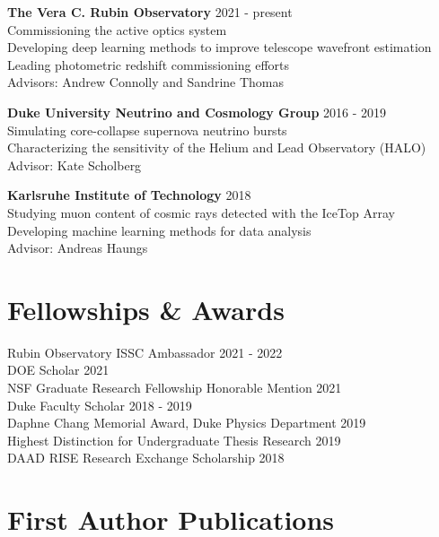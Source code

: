 \documentclass[margin, 11pt]{res}
\begin{document}
\begin{resume}
\textbf{The Vera C. Rubin Observatory} \hfill 2021 - present \\
Commissioning the active optics system \\
Developing deep learning methods to improve telescope wavefront estimation \\
Leading photometric redshift commissioning efforts \\
Advisors: Andrew Connolly and Sandrine Thomas

\textbf{Duke University Neutrino and Cosmology Group} \hfill 2016 - 2019 \\
Simulating core-collapse supernova neutrino bursts \\
Characterizing the sensitivity of the Helium and Lead Observatory (HALO) \\
Advisor: Kate Scholberg

\textbf{Karlsruhe Institute of Technology} \hfill 2018 \\
Studying muon content of cosmic rays detected with the IceTop Array \\
Developing machine learning methods for data analysis \\
Advisor: Andreas Haungs


\section{Fellowships \& Awards}
Rubin Observatory ISSC Ambassador \hfill 2021 - 2022 \\
DOE Scholar \hfill 2021 \\
NSF Graduate Research Fellowship Honorable Mention \hfill 2021 \\
Duke Faculty Scholar \hfill 2018 - 2019 \\
Daphne Chang Memorial Award, Duke Physics Department \hfill 2019 \\
Highest Distinction for Undergraduate Thesis Research \hfill 2019 \\
DAAD RISE Research Exchange Scholarship \hfill 2018 \\

\newpage
\section{First Author Publications}


\end{resume}
\end{document}
